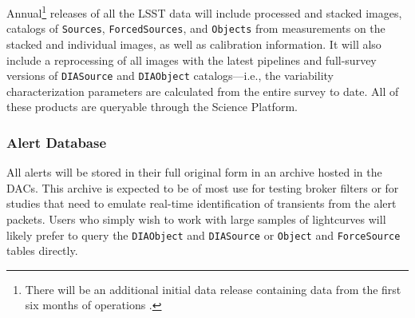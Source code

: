 Annual\footnote{There will be an additional initial data release containing data from the first six months of operations .}  releases of all the LSST data will include processed and stacked images, catalogs of {\tt Sources}, {\tt ForcedSources}, and {\tt Objects} from measurements on the stacked and individual images, as well as calibration information.
It will also include a  reprocessing of all images with the latest pipelines and full-survey versions of {\tt DIASource} and {\tt DIAObject} catalogs---i.e., the variability characterization parameters are calculated from the entire survey to date.
All of these products are queryable through the Science Platform.

\subsubsection{Alert Database} \label{sec:alertdb}

All alerts will be stored in their full original form in an archive hosted in the DACs.
This archive is expected to be of most use for testing broker filters or for studies that need to emulate real-time identification of transients from the alert packets.
Users who simply wish to work with large samples of lightcurves will likely prefer to query the \texttt{DIAObject} and \texttt{DIASource} or \texttt{Object} and \texttt{ForceSource} tables directly.
